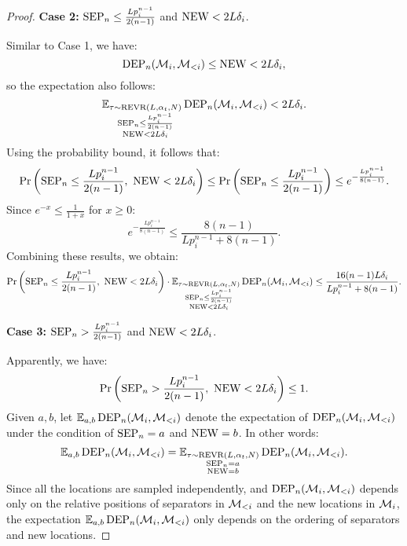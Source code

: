 \begin{proof}
\textbf{Case 2:} $\operatorname{SEP}_n\leq \frac{Lp_i^{n-1}}{2(n-1)}$ and $ \operatorname{NEW}<2L\delta_i$.

Similar to Case 1, we have:
$$\operatorname{DEP}_n({\mathcal{M}}_i, {\mathcal{M}}_{<i})\leq\operatorname{NEW}<2L\delta_i,$$
so the expectation also follows:
$$\mathbb{E}_{\substack{\tau \sim \operatorname{REVR}(L, \alpha_t, N)\\ \operatorname{SEP}_n\leq \frac{Lp_i^{n-1}}{2(n-1)}\\ \operatorname{NEW}< 2L\delta_i}} \operatorname{DEP}_n({\mathcal{M}}_i, {\mathcal{M}}_{<i})< 2L\delta_i.$$
Using the probability bound, it follows that:
$$\Pr\left(\SEP_n\leq \frac{Lp_i^{n-1}}{2(n-1)},\ \NEW< 2L\delta_i\right)\leq\Pr\left(\SEP_n\leq \frac{Lp_i^{n-1}}{2(n-1)}\right)\leq e^{-\frac{Lp_i^{n-1}}{8(n-1)}}.$$
Since $e^{-x}\leq\frac{1}{1+x}$ for $x\geq 0$:
$$e^{-\frac{Lp_i^{n-1}}{8(n-1)}}\leq\frac{8(n-1)}{Lp_i^{n-1}+8(n-1)}.$$
Combining these results, we obtain:
$$\Pr\left(\SEP_n\leq \frac{Lp_i^{n-1}}{2(n-1)},\ \NEW< 2L\delta_i\right)\cdot\mathbb{E}_{\substack{\tau \sim \PROC(L, \alpha_t, N)\\ \SEP_n\leq \frac{Lp_i^{n-1}}{2(n-1)}\\ \NEW< 2L\delta_i}} \DEP_n(\gM_i, \gM_{<i})\leq \frac{16(n-1)L\delta_i}{Lp_i^{n-1}+8(n-1)}.$$

\textbf{Case 3:} $\operatorname{SEP}_n>\frac{Lp_i^{n-1}}{2(n-1)}$ and $ \operatorname{NEW}<2L\delta_i$.

Apparently, we have:
$$\Pr\left(\SEP_n>\frac{Lp_i^{n-1}}{2(n-1)},\ \NEW< 2L\delta_i\right)\leq 1.$$
Given $a,b$, let $\mathbb{E}_{a,b}\operatorname{DEP}_n({\mathcal{M}}_i, {\mathcal{M}}_{<i})$ denote the expectation of $\operatorname{DEP}_n({\mathcal{M}}_i, {\mathcal{M}}_{<i})$ under the condition of $\operatorname{SEP}_n=a$ and $ \operatorname{NEW}=b$. In other words:
$$\mathbb{E}_{a,b}\operatorname{DEP}_n({\mathcal{M}}_i, {\mathcal{M}}_{<i})=\mathbb{E}_{\substack{\tau \sim \operatorname{REVR}(L, \alpha_t, N)\\ \operatorname{SEP}_n=a\\ \operatorname{NEW}=b}} \operatorname{DEP}_n({\mathcal{M}}_i, {\mathcal{M}}_{<i}).$$
Since all the locations are sampled independently, and $\operatorname{DEP}_n({\mathcal{M}}_i, {\mathcal{M}}_{<i})$ depends only on the relative positions of separators in ${\mathcal{M}}_{<i}$ and the new locations in ${\mathcal{M}}_i$, the expectation $\mathbb{E}_{a,b}\operatorname{DEP}_n({\mathcal{M}}_i, {\mathcal{M}}_{<i})$ only depends on the ordering of separators and new locations.


\end{proof}
